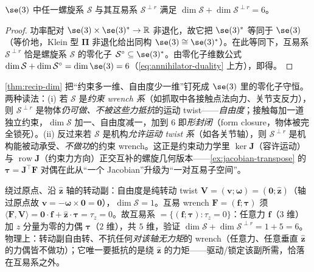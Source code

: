 \begin{theorem}[互易螺旋系的维数：$\dim\mathcal{S}+\dim\mathcal{S}^{\perp r}=6$]\label{thm:recip-dim}
$\se(3)$ 中任一螺旋系 $\mathcal{S}$ 与其互易系 $\mathcal{S}^{\perp r}$ 满足 $\dim\mathcal{S}+\dim\mathcal{S}^{\perp r}=6$。
\end{theorem}
\begin{proof}
功率配对 $\se(3)\times\se(3)^*\to\mathbb{R}$ 非退化，故它把 $\se(3)^*$ 等同于 $\se(3)$（等价地，Klein 型 $\boldsymbol{\Pi}$ 非退化给出同构 $\se(3)\cong\se(3)^*$）。在此等同下，互易系 $\mathcal{S}^{\perp r}$ 恰是螺旋系 $\mathcal{S}$ 的零化子 $\mathcal{S}^\circ\subseteq\se(3)^*$。由零化子维数公式 $\dim\mathcal{S}+\dim\mathcal{S}^\circ=\dim\se(3)=6$（\cref{eq:annihilator-duality} 上方），即得。
\end{proof}

\begin{insight}\label{ins:recip-duality}
\cref{thm:recip-dim} 把“约束多一维、自由度少一维”钉死成 $\se(3)$ 里的零化子守恒。两种读法：(i) 若 $\mathcal{S}$ 是\emph{约束 wrench 系}（如抓取中各接触点法向力、关节支反力），则 $\mathcal{S}^{\perp r}$ 是物体\emph{仍可做、不被这些力抵抗}的运动 twist——\emph{自由度}；接触每加一道独立约束，$\dim\mathcal{S}$ 加一、自由度减一，加到 $6$ 即\emph{形封闭}（form closure，物体被完全锁死）。(ii) 反过来若 $\mathcal{S}$ 是机构\emph{允许运动 twist 系}（如各关节轴），则 $\mathcal{S}^{\perp r}$ 是机构能被动承受、\emph{不做功}的约束 wrench。这正是约束动力学里 $\ker\mathbf{J}$（容许运动）与 $\operatorname{row}\mathbf{J}$（约束力方向）正交互补的螺旋几何版本——\cref{ex:jacobian-transpose} 的 $\boldsymbol{\tau}=\mathbf{J}^\top\mathbf{F}$ 对偶在此从“一个 Jacobian”升级为“一对互易子空间”。
\end{insight}

\begin{example}\label{ex:recip-revolute}
绕过原点、沿 $\hat{\mathbf{z}}$ 轴的转动副：自由度是纯转动 twist $\mathbf{V}=(\mathbf{v};\boldsymbol{\omega})=(\mathbf{0};\hat{\mathbf{z}})$（轴过原点故 $\mathbf{v}=-\boldsymbol{\omega}\times\mathbf{0}=\mathbf{0}$），$\dim\mathcal{S}=1$。互易 wrench $\mathbf{F}=(\mathbf{f};\boldsymbol{\tau})$ 须 $\langle\mathbf{F},\mathbf{V}\rangle=\mathbf{0}\cdot\mathbf{f}+\hat{\mathbf{z}}\cdot\boldsymbol{\tau}=\tau_z=0$。故互易系 $=\{(\mathbf{f};\boldsymbol{\tau}):\tau_z=0\}$：任意力 $\mathbf{f}$（$3$ 维）加 $z$ 分量为零的力偶 $\boldsymbol{\tau}$（$2$ 维），共 $5$ 维，验证 $\dim\mathcal{S}+\dim\mathcal{S}^{\perp r}=1+5=6$。物理上：转动副自由转、不抗任何\emph{对该轴无力矩}的 wrench（任意力、任意垂直 $\hat{\mathbf{z}}$ 的力偶皆不做功）；它唯一要抵抗的是绕 $\hat{\mathbf{z}}$ 的力矩——驱动/锁定该副所需，恰落在互易系之外。
\end{example}

